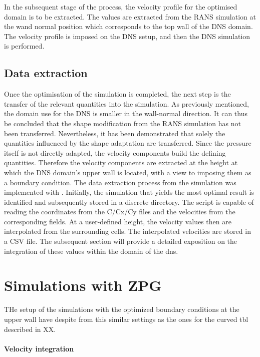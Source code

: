 In the subsequent stage of the process, the velocity profile for the optimised domain is to be extracted. 
The values are extracted from the RANS simulation at the wand normal position which corresponds to the top wall of the DNS domain. 
The velocity profile is imposed on the DNS setup, and then the DNS simulation is performed. 

\subsection{Data extraction} \label{subsec:data_extr}

Once the optimisation of the  simulation is completed, the next step is the transfer of the relevant quantities into the  simulation.
As previously mentioned, the domain use for the DNS is smaller in the wall-normal direction. 
It can thus be concluded that the shape modification from the RANS simulation has not been transferred.
Nevertheless, it has been demonstrated that solely the quantities influenced by the shape adaptation are transferred.
Since the pressure itself is not directly adapted, the velocity components build the defining quantities.
Therefore the velocity components are extracted at the height at which  the DNS domain's upper wall is located, with a view to imposing them as a  boundary condition.
The data extraction process from the  simulation was implemented with .
Initially, the simulation that yields the most optimal result is identified and subsequently stored in a discrete directory.
The  script  is capable of reading  the coordinates from the C/Cx/Cy files and the velocities from the corresponding fields. 
At a user-defined height, the velocity values then are interpolated from the surrounding cells. 
The interpolated velocities are stored in a CSV file. 
The subsequent section will provide a detailed exposition on the integration of these values within the domain of the \acrshort{dns}.

\section{Simulations with ZPG}

THe setup of the simulations with the optimized boundary conditions at the upper wall have despite from this similar settings as the ones for the curved \acrshort{tbl} described in XX.

\paragraph{Velocity integration}


